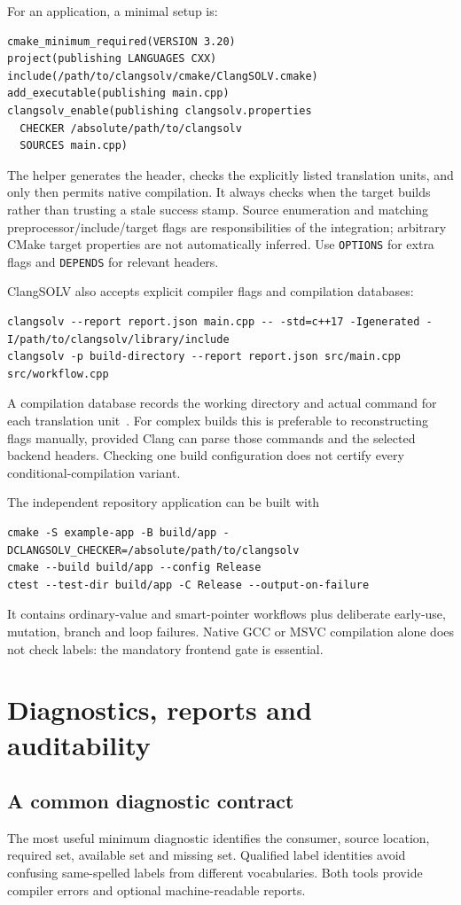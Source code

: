 \documentclass[11pt]{article}
\begin{document}
For an application, a minimal setup is:
\begin{lstlisting}
cmake_minimum_required(VERSION 3.20)
project(publishing LANGUAGES CXX)
include(/path/to/clangsolv/cmake/ClangSOLV.cmake)
add_executable(publishing main.cpp)
clangsolv_enable(publishing clangsolv.properties
  CHECKER /absolute/path/to/clangsolv
  SOURCES main.cpp)
\end{lstlisting}
The helper generates the header, checks the explicitly listed translation
units, and only then permits native compilation. It always checks when the
target builds rather than trusting a stale success stamp. Source enumeration
and matching preprocessor/include/target flags are responsibilities of the
integration; arbitrary CMake target properties are not automatically inferred.
Use \texttt{OPTIONS} for extra flags and \texttt{DEPENDS} for relevant headers.

ClangSOLV also accepts explicit compiler flags and compilation databases:
\begin{lstlisting}
clangsolv --report report.json main.cpp -- -std=c++17 -Igenerated -I/path/to/clangsolv/library/include
clangsolv -p build-directory --report report.json src/main.cpp src/workflow.cpp
\end{lstlisting}
A compilation database records the working directory and actual command
for each translation unit~\cite{compdb}. For complex builds this is preferable
to reconstructing flags manually, provided Clang can parse those commands
and the selected backend headers. Checking one build configuration does not
certify every conditional-compilation variant.

The independent repository application can be built with
\begin{lstlisting}
cmake -S example-app -B build/app -DCLANGSOLV_CHECKER=/absolute/path/to/clangsolv
cmake --build build/app --config Release
ctest --test-dir build/app -C Release --output-on-failure
\end{lstlisting}
It contains ordinary-value and smart-pointer workflows plus deliberate
early-use, mutation, branch and loop failures. Native GCC or MSVC compilation
alone does not check labels: the mandatory frontend gate is essential.

\section{Diagnostics, reports and auditability}
\subsection{A common diagnostic contract}
The most useful minimum diagnostic identifies the consumer, source location,
required set, available set and missing set. Qualified label identities avoid
confusing same-spelled labels from different vocabularies. Both tools provide
compiler errors and optional machine-readable reports.
\end{document}
